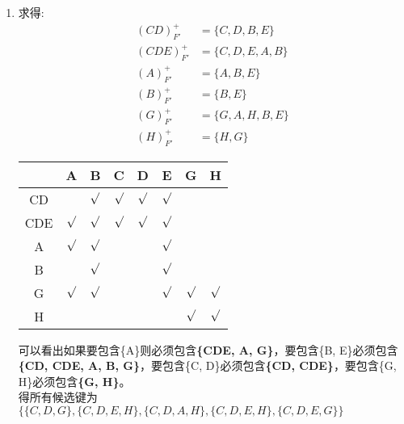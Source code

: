\begin{enumerate}
	\item 
	求得:
	\begin{align*}
		(CD)^{+}_{F'} &= \{C, D, B, E\} \\
		(CDE)^{+}_{F'} &= \{C, D, E, A, B\} \\
		(A)^{+}_{F'} &= \{A, B, E\} \\
		(B)^{+}_{F'} &= \{B, E\} \\
		(G)^{+}_{F'} &= \{G, A, H, B, E\} \\
		(H)^{+}_{F'} &= \{H, G\}
	\end{align*}
	\begin{table}[H]
		\centering
		\begin{tabular}{|c|c|c|c|c|c|c|c|}
			\hline
			~ & A & B & C & D & E & G & H \\\hline
			CD & & $\surd$ & $\surd$ & $\surd$ & $\surd$ & & \\
			CDE & $\surd$ & $\surd$ & $\surd$ & $\surd$ & $\surd$ & & \\
			A & $\surd$ & $\surd$ & & & $\surd$ & & \\
			B & & $\surd$ & & & $\surd$ & & \\
			G & $\surd$ & $\surd$ & & & $\surd$ & $\surd$ & $\surd$ \\
			H & & & & & & $\surd$ & $\surd$ \\\hline
		\end{tabular}
	\end{table}
	可以看出如果要包含\{A\}则必须包含\textbf{\{CDE, A, G\}}，要包含\{B, E\}必须包含\textbf{\{CD, CDE, A, B, G\}}，要包含\{C, D\}必须包含\textbf{\{CD, CDE\}}，要包含\{G, H\}必须包含\textbf{\{G, H\}}。\\
	得所有候选键为$\{\{C, D, G\}, \{C, D, E, H\}, \{C, D, A, H\}, \{C, D, E, H\}, \{C, D, E, G\}\}$
\end{enumerate}